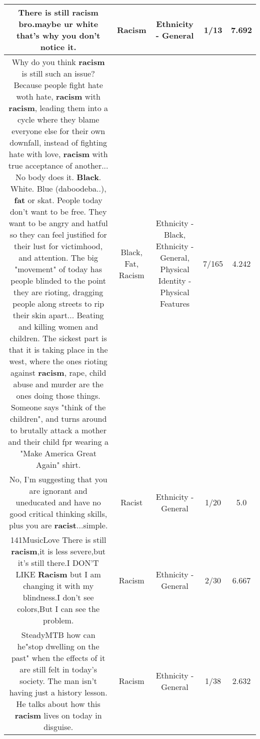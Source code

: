 \documentclass[11pt]{article}
\newlength\mylength
\begin{document}
\begin{center}
\begin{longtable}{|C{.65\mylength}|C{.30\mylength}|C{.12\mylength}|C{.12\mylength}|C{.12\mylength}|}
  \small There is still \textbf{racism} bro.maybe ur white that's why you don't notice it.\normalsize   & Racism & Ethnicity - General & 1/13 & 7.692 \\  \hline
  \small Why do you think \textbf{racism} is still such an issue? Because people fight hate woth hate, \textbf{racism} with \textbf{racism}, leading them into a cycle where they blame everyone else for their own downfall, instead of fighting hate with love, \textbf{racism} with true acceptance of another... No body does it. \textbf{Black}. White. Blue (daboodeba..), \textbf{fat} or skat.  People today don't want to be free. They want to be angry and hatful so they can feel justified for their lust for victimhood, and attention. The big "movement" of today has people blinded to the point they are rioting, dragging people along streets to rip their skin apart... Beating and killing women and children. The sickest part is that it is taking place in the west, where the ones rioting against \textbf{racism}, rape, child abuse and murder are the ones doing those things. Someone says "think of the children", and turns around to brutally attack a mother and their child fpr wearing a "Make America Great Again" shirt.\normalsize   & Black, Fat, Racism & Ethnicity - Black, Ethnicity - General, Physical Identity - Physical Features & 7/165 & 4.242 \\  \hline
  \small No, I'm suggesting that you are ignorant and uneducated and have no good critical thinking skills, plus you are \textbf{racist}...simple.\normalsize   & Racist & Ethnicity - General & 1/20 & 5.0 \\  \hline
  \small 141MusicLove There is still \textbf{racism},it is less severe,but it's still there.I DON'T LIKE \textbf{Racism} but I am changing it with my blindness.I don't see colors,But I can see the problem.\normalsize   & Racism & Ethnicity - General & 2/30 & 6.667 \\  \hline
  \small SteadyMTB how can he"stop dwelling on the past" when the effects of it are still felt in today's society. The man isn't having just a history lesson. He talks about how this \textbf{racism} lives on today in disguise.\normalsize   & Racism & Ethnicity - General & 1/38 & 2.632 \\  \hline

\end{longtable}
\end{center}
\end{document}
